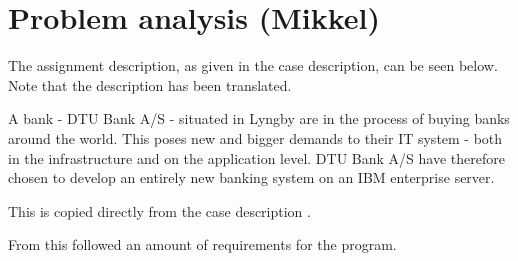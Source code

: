\section{Problem analysis (Mikkel)}



The assignment description, as given in the case description, can be seen below. Note that the description has been translated.

\begin{mdframed}[backgroundcolor=black!5]
A bank - DTU Bank A/S - situated in Lyngby are in the process of buying banks around the world. This poses new and bigger demands to their IT system - both in the infrastructure and on the application level. DTU Bank A/S have therefore chosen to develop an entirely new banking system on an IBM enterprise server.
\end{mdframed}
 
This is copied directly from the case description \cite{case_description}.

From this followed an amount of requirements for the program. 
